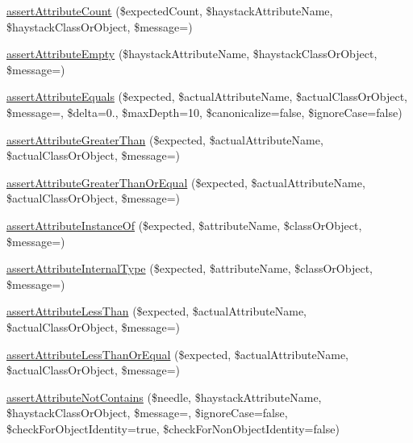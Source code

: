\begin{DoxyCompactItemize}
\mbox{\hyperlink{_functions_8php_ad0568e195e3929e5e67fa40f167bd11d}{assert\+Attribute\+Count}} (\$expected\+Count, \$haystack\+Attribute\+Name, \$haystack\+Class\+Or\+Object, \$message=\textquotesingle{}\textquotesingle{})
\item 
\mbox{\hyperlink{_functions_8php_a1e7a75d395863664ab2a9362d0614658}{assert\+Attribute\+Empty}} (\$haystack\+Attribute\+Name, \$haystack\+Class\+Or\+Object, \$message=\textquotesingle{}\textquotesingle{})
\item 
\mbox{\hyperlink{_functions_8php_aeb82d68f71035597fb7c212e56e1be1e}{assert\+Attribute\+Equals}} (\$expected, \$actual\+Attribute\+Name, \$actual\+Class\+Or\+Object, \$message=\textquotesingle{}\textquotesingle{}, \$delta=0., \$max\+Depth=10, \$canonicalize=false, \$ignore\+Case=false)
\item 
\mbox{\hyperlink{_functions_8php_ab8cd91a8fbc0df91623beac7c9272a3e}{assert\+Attribute\+Greater\+Than}} (\$expected, \$actual\+Attribute\+Name, \$actual\+Class\+Or\+Object, \$message=\textquotesingle{}\textquotesingle{})
\item 
\mbox{\hyperlink{_functions_8php_ac48292bd17fe899cb6ca88fc0008cc2c}{assert\+Attribute\+Greater\+Than\+Or\+Equal}} (\$expected, \$actual\+Attribute\+Name, \$actual\+Class\+Or\+Object, \$message=\textquotesingle{}\textquotesingle{})
\item 
\mbox{\hyperlink{_functions_8php_a9bba1c1f01212c165ebc2c4889d5a3d6}{assert\+Attribute\+Instance\+Of}} (\$expected, \$attribute\+Name, \$class\+Or\+Object, \$message=\textquotesingle{}\textquotesingle{})
\item 
\mbox{\hyperlink{_functions_8php_a552ca36da490b115182ab8964f6eb095}{assert\+Attribute\+Internal\+Type}} (\$expected, \$attribute\+Name, \$class\+Or\+Object, \$message=\textquotesingle{}\textquotesingle{})
\item 
\mbox{\hyperlink{_functions_8php_a5cbfa87dd5a216364ca09c012d448094}{assert\+Attribute\+Less\+Than}} (\$expected, \$actual\+Attribute\+Name, \$actual\+Class\+Or\+Object, \$message=\textquotesingle{}\textquotesingle{})
\item 
\mbox{\hyperlink{_functions_8php_aab5e4ab9077d2eeb1e01f2383477a454}{assert\+Attribute\+Less\+Than\+Or\+Equal}} (\$expected, \$actual\+Attribute\+Name, \$actual\+Class\+Or\+Object, \$message=\textquotesingle{}\textquotesingle{})
\item 
\mbox{\hyperlink{_functions_8php_af97143ec0bd76d7469f5c1256aa6d485}{assert\+Attribute\+Not\+Contains}} (\$needle, \$haystack\+Attribute\+Name, \$haystack\+Class\+Or\+Object, \$message=\textquotesingle{}\textquotesingle{}, \$ignore\+Case=false, \$check\+For\+Object\+Identity=true, \$check\+For\+Non\+Object\+Identity=false)

\end{DoxyCompactItemize}
